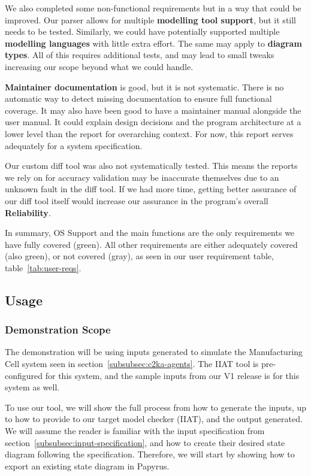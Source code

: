 We also completed some non-functional requirements but in a way that could be improved.
Our parser allows for multiple \textbf{modelling tool support}, but it still needs to be tested.
Similarly, we could have potentially supported multiple \textbf{modelling languages} with little extra effort.
The same may apply to \textbf{diagram types}.
All of this requires additional tests, and may lead to small tweaks increasing our scope beyond what we could handle.

\textbf{Maintainer documentation} is good, but it is not systematic.
There is no automatic way to detect missing documentation to ensure full functional coverage.
It may also have been good to have a maintainer manual alongside the user manual.
It could explain design decisions and the program architecture at a lower level than the report for overarching context.
For now, this report serves adequately for a system specification.

Our custom diff tool was also not systematically tested.
This means the reports we rely on for accuracy validation may be inaccurate themselves due to an unknown fault in the diff tool.
If we had more time, getting better assurance of our diff tool itself would increase our assurance in the program's overall
\textbf{Reliability}.

In summary, OS Support and the main functions are the only requirements we have fully covered (green).
All other requirements are either adequately covered (also green), or not covered (gray),
as seen in our user requirement table, table~\ref{tab:user-reqs}.


\subsection{Usage}\label{subsec:usage}
\subsubsection{Demonstration Scope}\label{subsubsec:scope}
The demonstration will be using inputs generated to simulate the Manufacturing Cell system seen in section~\ref{subsubsec:c2ka-agents}.
The IIAT tool is pre-configured for this system, and the sample inputs from our V1 release is for this system as well.

To use our tool, we will show the full process from how to generate the inputs,
up to how to provide to our target model checker (IIAT), and the output generated.
We will assume the reader is familiar with the input specification from section~\ref{subsubsec:input-specification},
and how to create their desired state diagram following the specification.
Therefore, we will start by showing how to export an existing state diagram in Papyrus.

